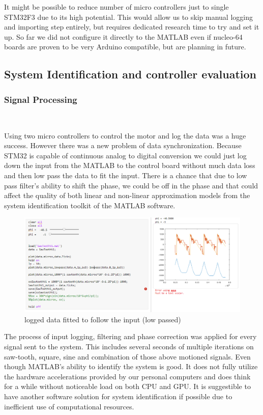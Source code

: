 \documentclass[]{final_report}
\begin{document}
It might be possible to reduce number of micro controllers just to single STM32F3 due to its high potential. This would allow us to skip manual logging and importing step entirely, but requires dedicated research time to try and set it up. So far we did not configure it directly to the MATLAB even if nucleo-64 boards are proven to be very Arduino compatible, but are planning in future.

\subsection{System Identification and controller evaluation}
\subsubsection{Signal Processing}\

Using two micro controllers to control the motor and log the data was a huge success. However there was a new problem of data synchronization. Because STM32 is capable of continuous analog to digital conversion we could just log down the input from the MATLAB to the control board without much data loss and then low pass the data to fit the input. There is a chance that due to low pass filter's ability to shift the phase, we could be off in the phase and that could affect the quality of both linear and non-linear approximation models from the system identification toolkit of the MATLAB software.

\begin{figure} [h!]
\centerline{\includegraphics[width=.75\textwidth]{Screenshots for paper/matlab models/data reconstruction.PNG}}
\caption{logged data fitted to follow the input (low passed)}
\label{fig:dataReconstruction}
\end{figure}

The process of input logging, filtering and phase correction was applied for every signal sent to the system. This includes several seconds of multiple iterations on saw-tooth, square, sine and combination of those above motioned signals. Even though MATLAB's ability to identify the system is good. It does not fully utilize the hardware accelerations provided by our personal computers and does think for a while without noticeable load on both CPU and GPU. It is suggestible to have another software solution for system identification if possible due to inefficient use of computational resources.
\end{document}
